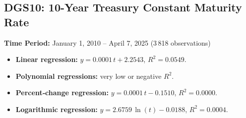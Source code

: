 \documentclass[11pt,a4paper]{article}
\begin{document}
\clearpage
\subsection{DGS10: 10-Year Treasury Constant Maturity Rate}
\textbf{Time Period:} January 1, 2010 – April 7, 2025 (3\,818 observations)

\begin{itemize}
  \item \textbf{Linear regression:} \(y = 0.0001\,t + 2.2543\), \(R^2 = 0.0549\).
  \item \textbf{Polynomial regressions:} very low or negative \(R^2\).
  \item \textbf{Percent‐change regression:} \(y = 0.0001\,t - 0.1510\), \(R^2 = 0.0000\).
  \item \textbf{Logarithmic regression:} \(y = 2.6759\,\ln(t) - 0.0188\), \(R^2 = 0.0004\).
\end{itemize}
\end{document}
